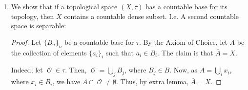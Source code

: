 \documentclass{book}
\DeclareMathOperator*{\Ocal}{\mathcal{O}}
\begin{document}
\begin{enumerate}[(1)]
    \item We show that if a topological space $(X, \tau)$ has a countable base for its topology, then $X$ contains a countable dense subset. I.e. A second countable space is separable: 
        \begin{proof} Let $\{B_n\}_n$ be a countable base for $\tau$. By the Axiom of Choice, let $A$ be the collection of elements $\{a_i\}_i$ such that $a_i \in B_i$. The claim is that $\overline{A} = X$. 
            \par Indeed; let ${\Ocal} \in \tau$. Then, ${\Ocal} = \bigcup_j B_j$, where $B_j \in B$. Now, as $A = \bigcup_i x_i$, where $x_i \in B_i$, we have $A \cap {\Ocal} \neq \emptyset$. Thus, by extra lemma, $\overline{A} = X$. 
        \end{proof}

\end{enumerate}
\end{document}
